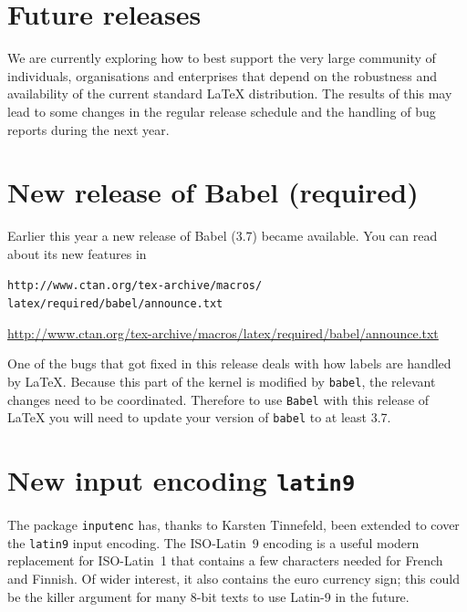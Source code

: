 \documentclass{ltnews}
\providecommand\pkg[1]{\texttt{#1}}
\providecommand\option[1]{\texttt{#1}}
\providecommand\file[1]{\texttt{#1}}
\begin{document}
\maketitle

\raisefirstsection
\section{Future releases}

We  are currently exploring how to best support the very large
community of individuals, organisations and enterprises that depend on
the robustness and availability of the current standard \LaTeX{}
distribution.  The results of this may lead to some changes in the
regular release schedule and the handling of bug reports during the
next year.

\section{New release of \textsf{Babel} (required)}

Earlier this year a new release of \textsf{Babel} (3.7) became
available. You can read about its new features in
\begin{latexonly}
  \file{http://www.ctan.org/tex-archive/macros/}\\
  \hspace*{4em}\file{latex/required/babel/announce.txt}
\end{latexonly}
\begin{htmlonly}
  \url{http://www.ctan.org/tex-archive/macros/latex/required/babel/announce.txt}
\end{htmlonly}

One of the bugs that got fixed in this release deals with how labels
are handled by \LaTeX{}.  Because this part of the kernel is modified
by \pkg{babel}, the relevant changes need to be coordinated.
Therefore to use \pkg{Babel} with this release of \LaTeX{} you will
need to update your version of \pkg{babel} to at least 3.7.

\section{New input encoding \option{latin9}}

The package \pkg{inputenc} has, thanks to Karsten Tinnefeld, been
extended to cover the \option{latin9} input encoding.  The
ISO-Latin~9 encoding is a useful modern replacement for ISO-Latin~1
that contains a few characters needed for French and Finnish. Of wider
interest, it also contains the euro currency sign; this could be the
killer argument for many 8-bit texts to use Latin-9 in the future.
\end{document}
